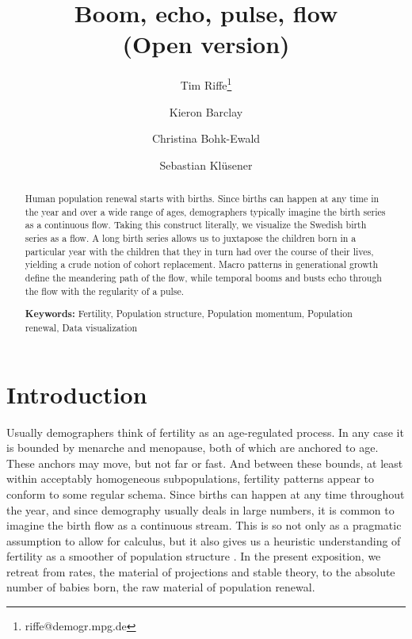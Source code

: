 \documentclass{article}
\begin{document}
\title{Boom, echo, pulse, flow\\ \small (Open version)}
\author[1]{Tim Riffe\thanks{riffe@demogr.mpg.de}}
\author[1]{Kieron Barclay}
\author[1]{Christina Bohk-Ewald}
\author[2]{Sebastian Kl\"usener}
\maketitle

\begin{abstract}
Human population renewal starts with births. Since births can happen at any
time in the year and over a wide range of ages, demographers typically imagine
the birth series as a continuous flow. Taking this construct literally, we
visualize the Swedish birth series as a flow. A long birth series allows us to
juxtapose the children born in a particular year with the children that
they in turn had over the course of their lives, yielding a crude notion of
cohort replacement. Macro patterns in generational growth define the meandering
path of the flow, while temporal booms and busts echo through the flow with the
regularity of a pulse.
\vspace{1em}

{\bf Keywords:} Fertility, Population structure, Population momentum, Population renewal, Data visualization
\end{abstract}

\onehalfspacing
\section{Introduction}
Usually demographers think of fertility as an age-regulated process. In any case it is
bounded by menarche and menopause, both of which are anchored to age. These anchors may
move, but not far or fast. And between these bounds, at least within acceptably homogeneous subpopulations, fertility patterns appear to conform to some regular schema. Since births can happen at any time throughout the year, and since demography usually deals in large numbers, it is common to imagine the birth flow as a continuous stream. This is so not only as a pragmatic assumption to allow for calculus, but it also gives us a heuristic understanding of fertility as a smoother of population structure \citep{arthur1982ergodic}. In the present exposition, we retreat from rates, the material of projections and stable theory, to the absolute number of babies born, the raw material of population renewal. 
\end{document}
